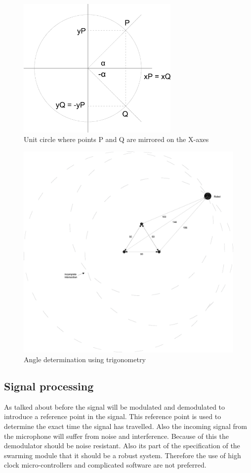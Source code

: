 \documentclass[10pt,a4paper]{article}
\begin{document}
\begin{figure}[H]
\centering
\includegraphics[width=0.7\textwidth]{Cirkel.pdf}
\caption{Unit circle where points P and Q are mirrored on the X-axes}
\label{circle}
\end{figure}



\begin{figure}[H]
\centering
\includegraphics[width=1\textwidth]{trigonometry.pdf}
\caption{Angle determination using trigonometry}
\label{trigonometry}
\end{figure}

\subsection{Signal processing}
As talked about before the signal will be modulated and demodulated to introduce a reference point in the signal. This reference point is used to  determine the exact time the signal has travelled. Also the incoming signal from the microphone will suffer from noise and interference. Because of this the demodulator should be noise resistant. Also its part of the specification of the swarming module that it should be a robust system. Therefore the use of high clock micro-controllers and complicated software are not preferred.
\end{document}
